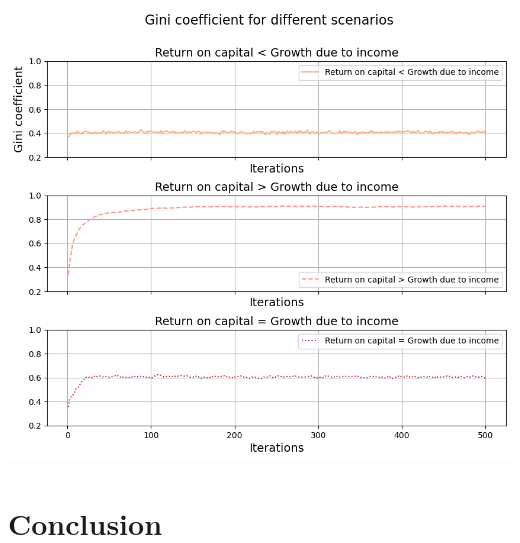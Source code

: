\documentclass{article}
\begin{document}
\includegraphics[width=\textwidth]{Pics/ratio_comparison.png}


\section*{Conclusion}
\end{document}
